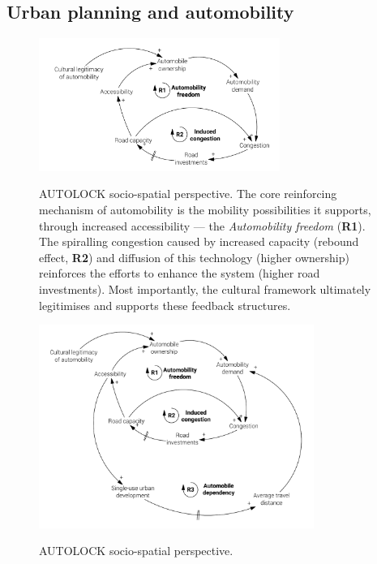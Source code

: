\subsection{Urban planning and automobility}
\label{ss:results:cld_urban-planning}

\begin{figure}[h]
\centering
\includegraphics[width=0.7\textwidth]{figures/model/cropped/congestion-urban_1_core.pdf}
\label{f:results:cld_congestion_1}
\caption[AUTOLOCK socio-spatial perspective: freedom and congestion]{AUTOLOCK socio-spatial perspective. The core reinforcing mechanism of automobility is the mobility possibilities it supports, through increased accessibility --- the \emph{Automobility freedom} (\textbf{R1}). The spiralling congestion caused by increased capacity (rebound effect, \textbf{R2}) and diffusion of this technology (higher ownership) reinforces the efforts to enhance the system (higher road investments). Most importantly, the cultural framework ultimately legitimises and supports these feedback structures.}
\end{figure}

\begin{figure}[h]
\centering
\includegraphics[width=0.8\textwidth]{figures/model/cropped/congestion-urban_2_dependency.pdf}
\label{f:results:cld_congestion_2}
\caption[AUTOLOCK socio-spatial perspective: freedom and congestion]{AUTOLOCK socio-spatial perspective.}
\end{figure}

